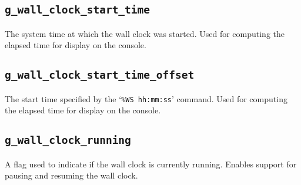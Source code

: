\documentclass[12pt]{report}
\begin{document}
\subsection{\texttt{g_wall_clock_start_time}}

The system time at which the wall clock was started. Used for computing the elapsed time for display on the console.

\subsection{\texttt{g_wall_clock_start_time_offset}}

The start time specified by the `\texttt{\%WS hh:mm:ss}' command. Used for computing the elapsed time for display on the console.

\subsection{\texttt{g_wall_clock_running}}

A flag used to indicate if the wall clock is currently running. Enables support for pausing and resuming the wall clock.
\end{document}
